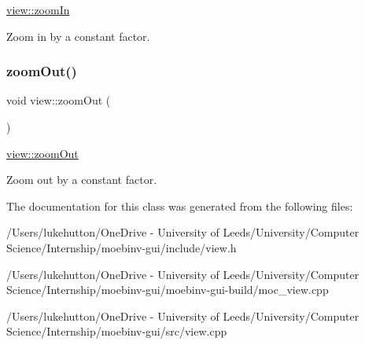 \mbox{\hyperlink{classview_af0f530013cb69c332de83d47d75a8fb0}{view\+::zoom\+In}} 

Zoom in by a constant factor. \mbox{\label{classview_a497e42c804c9937d94b373d53e163f1b}} 
\subsubsection{\texorpdfstring{zoom\+Out()}{zoomOut()}}
{\footnotesize\ttfamily void view\+::zoom\+Out (\begin{DoxyParamCaption}{ }\end{DoxyParamCaption})}



\mbox{\hyperlink{classview_a497e42c804c9937d94b373d53e163f1b}{view\+::zoom\+Out}} 

Zoom out by a constant factor. 

The documentation for this class was generated from the following files\+:\begin{DoxyCompactItemize}
\item 
/\+Users/lukehutton/\+One\+Drive -\/ University of Leeds/\+University/\+Computer Science/\+Internship/moebinv-\/gui/include/view.\+h\item 
/\+Users/lukehutton/\+One\+Drive -\/ University of Leeds/\+University/\+Computer Science/\+Internship/moebinv-\/gui/moebinv-\/gui-\/build/moc\+\_\+view.\+cpp\item 
/\+Users/lukehutton/\+One\+Drive -\/ University of Leeds/\+University/\+Computer Science/\+Internship/moebinv-\/gui/src/view.\+cpp\end{DoxyCompactItemize}
